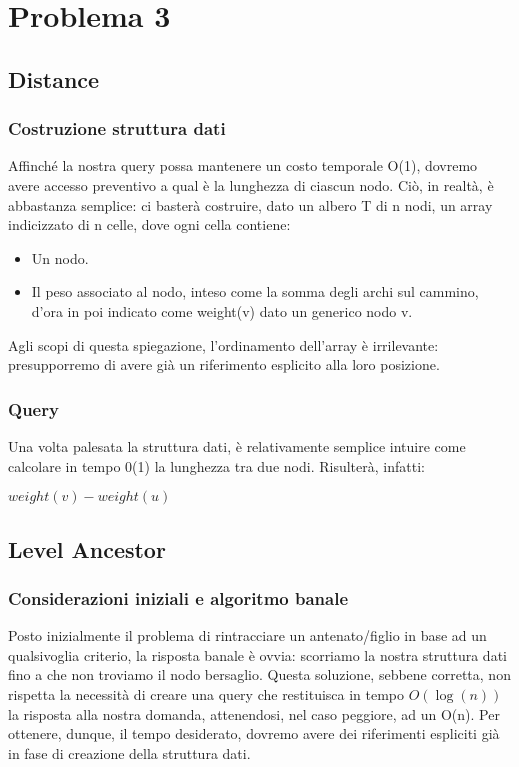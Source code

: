 \documentclass{article}
\begin{document}
\section{Problema 3}
\subsection{Distance}
\subsubsection{Costruzione struttura dati}
Affinché la nostra query possa mantenere un costo temporale O(1), dovremo avere accesso preventivo a qual è la lunghezza di ciascun nodo. Ciò, in realtà, è abbastanza semplice: ci basterà costruire, dato un albero T di n nodi, un array indicizzato di n celle, dove ogni cella contiene:
\begin{itemize}
	\item Un nodo.
	\item Il peso associato al nodo, inteso come la somma degli archi sul cammino, d'ora in poi indicato come weight(v) dato un generico nodo v.
\end{itemize}
Agli scopi di questa spiegazione, l'ordinamento dell'array è irrilevante: presupporremo di avere già un riferimento esplicito alla loro posizione.
\subsubsection{Query}
Una volta palesata la struttura dati, è relativamente semplice intuire come calcolare in tempo 0(1) la lunghezza tra due nodi. Risulterà, infatti: \newline
\newline

\begin{algorithmic}
	\State\Return $weight(v) - weight(u)$
	\EndFunction
\end{algorithmic}
\subsection{Level Ancestor}
\subsubsection{Considerazioni iniziali e algoritmo banale}
Posto inizialmente il problema di rintracciare un antenato/figlio in base ad un qualsivoglia criterio, la risposta banale è ovvia: scorriamo la nostra struttura dati fino a che non troviamo il nodo bersaglio.
Questa soluzione, sebbene corretta, non rispetta la necessità di creare una query che restituisca in tempo $O(\log(n))$ la risposta alla nostra domanda, attenendosi, nel caso peggiore, ad un O(n).
Per ottenere, dunque, il tempo desiderato, dovremo avere dei riferimenti espliciti già in fase di creazione della struttura dati.
\end{document}
